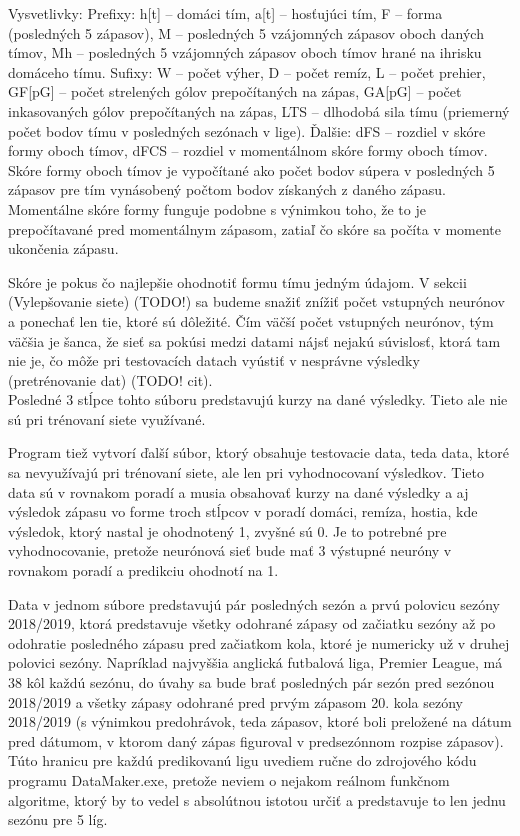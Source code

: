 Vysvetlivky: Prefixy: h[t] -- domáci tím, a[t] -- hosťujúci tím, F -- forma (posledných 5 zápasov), M -- posledných 5 vzájomných zápasov oboch daných tímov, Mh -- posledných 5 vzájomných zápasov oboch tímov hrané na ihrisku domáceho tímu.
Sufixy: W -- počet výher, D -- počet remíz, L -- počet prehier, GF[pG] -- počet strelených gólov prepočítaných na zápas, GA[pG] -- počet inkasovaných gólov prepočítaných na zápas, LTS -- dlhodobá sila tímu (priemerný počet bodov tímu v posledných sezónach v lige).
Ďalšie: dFS -- rozdiel v skóre formy oboch tímov, dFCS -- rozdiel v momentálnom skóre formy oboch tímov. 
Skóre formy oboch tímov je vypočítané ako počet bodov súpera v posledných 5 zápasov pre tím vynásobený počtom bodov získaných z daného zápasu. 
Momentálne skóre formy funguje podobne s výnimkou toho, že to je prepočítavané pred momentálnym zápasom, zatiaľ čo skóre sa počíta v momente ukončenia zápasu.
\fi

Skóre je pokus čo najlepšie ohodnotiť formu tímu jedným údajom. 
V sekcii (Vylepšovanie siete) (TODO!) sa budeme snažiť znížiť počet vstupných neurónov a ponechať len tie, ktoré sú dôležité. Čím väčší počet vstupných neurónov, tým väčšia je šanca, že sieť sa pokúsi medzi datami nájsť nejakú súvislosť, ktorá tam nie je, čo môže pri testovacích datach vyústiť v nesprávne výsledky (pretrénovanie dat) (TODO! cit).\\

Posledné 3 stĺpce tohto súboru predstavujú kurzy na dané výsledky. Tieto ale nie sú pri trénovaní siete využívané.

Program tiež vytvorí ďalší súbor, ktorý obsahuje testovacie data, teda data, ktoré sa nevyužívajú pri trénovaní siete, ale len pri vyhodnocovaní výsledkov. 
Tieto data sú v rovnakom poradí a musia obsahovať kurzy na dané výsledky a aj výsledok zápasu vo forme troch stĺpcov v poradí domáci, remíza, hostia, kde výsledok, ktorý nastal je ohodnotený 1, zvyšné sú 0. 
Je to potrebné pre vyhodnocovanie, pretože neurónová sieť bude mať 3 výstupné neuróny v rovnakom poradí a predikciu ohodnotí na 1.

Data v jednom súbore predstavujú pár posledných sezón a prvú polovicu sezóny 2018/2019, ktorá predstavuje všetky odohrané zápasy od začiatku sezóny až po odohratie posledného zápasu pred začiatkom kola, ktoré je numericky už v druhej polovici sezóny. 
Napríklad najvyššia anglická futbalová liga, Premier League, má 38 kôl každú sezónu, do úvahy sa bude brať posledných pár sezón pred sezónou 2018/2019 a všetky zápasy odohrané pred prvým zápasom 20. kola sezóny 2018/2019 (s výnimkou predohrávok, teda zápasov, ktoré boli preložené na dátum pred dátumom, v ktorom daný zápas figuroval v predsezónnom rozpise zápasov). 
Túto hranicu pre každú predikovanú ligu uvediem ručne do zdrojového kódu programu DataMaker.exe, pretože neviem o nejakom reálnom funkčnom algoritme, ktorý by to vedel s absolútnou istotou určiť a predstavuje to len jednu sezónu pre 5 líg.

